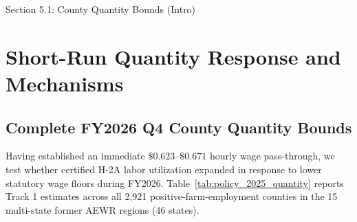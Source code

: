 \FloatBarrier
\begin{llmdraft}{Section 5.1: County Quantity Bounds (Intro)}
\section{Short-Run Quantity Response and Mechanisms}
\label{sec:quantity}

\subsection{Complete FY2026 Q4 County Quantity Bounds}

Having established an immediate $\$0.623$--$\$0.671$ hourly wage pass-through,
we test whether certified H-2A labor utilization expanded in response to lower
statutory wage floors during FY2026. Table~\ref{tab:policy_2025_quantity}
reports Track 1 estimates across all 2,921 positive-farm-employment counties in
the 15 multi-state former AEWR regions (46 states).
\end{llmdraft}



